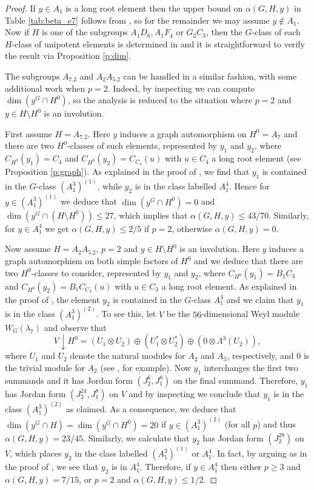 \documentclass[twoside,a4paper,reqno,11pt]{amsart}
\renewcommand{\a}{\alpha}
\renewcommand{\l}{\lambda}
\newcommand{\<}{\langle}
\renewcommand{\>}{\rangle}
\newcommand{\leqs}{\leqslant}
\newcommand{\geqs}{\geqslant}
\renewcommand{\:}{\colon}
\theoremstyle{plain}
\theoremstyle{definition}
\begin{document}
\begin{proof}
If $y \in A_1$ is a long root element then the upper bound on $\a(G,H,y)$ in Table \ref{tab:beta_e7} follows from \cite[Theorem 3.1]{BGG1}, so for the remainder we may assume $y \not\in A_1$. Now if $H$ is one of the subgroups $A_1D_6, A_1F_4$ or $G_2C_3$, then the $G$-class of each $H$-class of unipotent elements is determined in \cite{Law2} and it is straightforward to verify the result via Proposition \ref{p:dim}.

The subgroups $A_7.2$ and $A_2A_5.2$ can be handled in a similar fashion, with some additional work when $p=2$. Indeed, by inspecting \cite[Sections 4.11, 4.12]{Law2} we can compute $\dim(y^G \cap H^0)$, so the analysis is reduced to the situation where $p=2$ and $y \in H \setminus H^0$ is an involution. 

First assume $H = A_7.2$. Here $y$ induces a graph automorphism on $H^0 = A_7$ and there are two $H^0$-classes of such elements, represented by $y_1$ and $y_2$, where 
$C_{H^0}(y_1) = C_4$ and $C_{H^0}(y_2) = C_{C_4}(u)$ with $u \in C_4$ a long root element (see Proposition \ref{p:graph}). As explained in the proof of \cite[Lemma 3.18]{BGS}, we find that $y_1$ is contained in the $G$-class $(A_1^3)^{(1)}$, while $y_2$ is in the class labelled $A_1^4$. Hence for $y \in (A_1^3)^{(1)}$ we deduce that 
$\dim(y^G \cap H^0) = 0$ and $\dim (y^G \cap (H \setminus H^0)) \leqs 27$, which implies that $\a(G,H,y) \leqs 43/70$. Similarly, for $y \in A_1^4$ we get $\a(G,H,y) \leqs 2/5$ if $p=2$, otherwise $\a(G,H,y) = 0$. 

Now assume $H = A_2A_5.2$, $p=2$ and $y \in H \setminus H^0$ is an involution. Here $y$ induces a graph automorphism on both simple factors of $H^0$ and we deduce that there are two $H^0$-classes to consider, represented by $y_1$ and $y_2$, where $C_{H^0}(y_1) = B_1C_3$ and $C_{H^0}(y_2) = B_1C_{C_3}(u)$ with $u \in C_3$ a long root element. As explained in the proof of \cite[Lemma 3.12]{BGG1}, the element $y_2$ is contained in the $G$-class $A_1^4$ and we claim that $y_1$ is in the class $(A_1^3)^{(2)}$. To see this, let $V$ be the $56$-dimensional Weyl module $W_G(\l_7)$  and observe that
\[
V\downarrow H^0 = (U_1 \otimes U_2) \oplus (U_1^* \otimes U_2^*) \oplus (0 \otimes \Lambda^3(U_2)),
\]
where $U_1$ and $U_2$ denote the natural modules for $A_2$ and $A_5$, respectively, and $0$ is the trivial module for $A_2$ (see \cite[Table 4]{Thomas}, for example). Now $y_1$ interchanges the first two summands and it has Jordan form $(J_2^6,J_1^8)$ on the final summand. Therefore, $y_1$ has Jordan form $(J_2^{24},J_1^8)$ on $V$ and by inspecting \cite[Table 7]{Law1} we conclude that $y_1$ is in the class $(A_1^3)^{(2)}$ as claimed. As a consequence, we deduce that $\dim(y^G \cap H) = \dim(y^G \cap H^0) = 20$ if $y \in (A_1^3)^{(2)}$ (for all $p$) and thus $\a(G,H,y) = 23/45$. Similarly, we calculate that $y_2$ has Jordan form $(J_2^{28})$ on $V$, which places $y_2$ in the class labelled $(A_1^3)^{(1)}$ or $A_1^4$. In fact, by arguing as in the proof of \cite[Lemma 3.12]{BGG1}, we see that $y_2$ is in $A_1^4$. Therefore, if $y \in A_1^4$ then either $p \geqs 3$ and $\a(G,H,y) = 7/15$, or $p=2$ and $\a(G,H,y) \leqs 1/2$. 



\end{proof}
\end{document}
